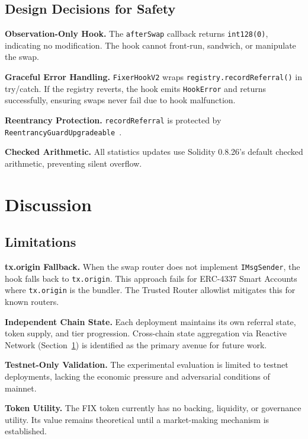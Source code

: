 \documentclass[conference]{IEEEtran}
\begin{document}
\subsection{Design Decisions for Safety}

\textbf{Observation-Only Hook.} The \texttt{afterSwap} callback returns \texttt{int128(0)}, indicating no modification. The hook cannot front-run, sandwich, or manipulate the swap.

\textbf{Graceful Error Handling.} \texttt{FixerHookV2} wraps \texttt{registry.recordReferral()} in try/catch. If the registry reverts, the hook emits \texttt{HookError} and returns successfully, ensuring swaps never fail due to hook malfunction.

\textbf{Reentrancy Protection.} \texttt{recordReferral} is protected by \texttt{Reentrancy\-Guard\-Upgradeable}~\cite{reentrancy}.

\textbf{Checked Arithmetic.} All statistics updates use Solidity 0.8.26's default checked arithmetic, preventing silent overflow.

\section{Discussion}
\label{sec:discussion}

\subsection{Limitations}

\textbf{tx.origin Fallback.} When the swap router does not implement \texttt{IMsgSender}, the hook falls back to \texttt{tx.origin}. This approach fails for ERC-4337 Smart Accounts where \texttt{tx.origin} is the bundler. The Trusted Router allowlist mitigates this for known routers.

\textbf{Independent Chain State.} Each deployment maintains its own referral state, token supply, and tier progression. Cross-chain state aggregation via Reactive Network (Section~\ref{sec:discussion}) is identified as the primary avenue for future work.

\textbf{Testnet-Only Validation.} The experimental evaluation is limited to testnet deployments, lacking the economic pressure and adversarial conditions of mainnet.

\textbf{Token Utility.} The FIX token currently has no backing, liquidity, or governance utility. Its value remains theoretical until a market-making mechanism is established.
\end{document}
